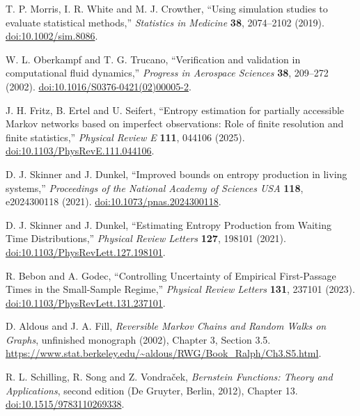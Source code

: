 T. P. Morris, I. R. White and M. J. Crowther,
``Using simulation studies to evaluate statistical methods,''
\emph{Statistics in Medicine} \textbf{38}, 2074--2102 (2019).
\href{https://doi.org/10.1002/sim.8086}{doi:10.1002/sim.8086}.

W. L. Oberkampf and T. G. Trucano,
``Verification and validation in computational fluid dynamics,''
\emph{Progress in Aerospace Sciences} \textbf{38}, 209--272 (2002).
\href{https://doi.org/10.1016/S0376-0421(02)00005-2}{doi:10.1016/S0376-0421(02)00005-2}.

J. H. Fritz, B. Ertel and U. Seifert,
``Entropy estimation for partially accessible Markov networks based on imperfect observations:
Role of finite resolution and finite statistics,''
\emph{Physical Review E} \textbf{111}, 044106 (2025).
\href{https://doi.org/10.1103/PhysRevE.111.044106}{doi:10.1103/PhysRevE.111.044106}.

D. J. Skinner and J. Dunkel,
``Improved bounds on entropy production in living systems,''
\emph{Proceedings of the National Academy of Sciences USA}
\textbf{118}, e2024300118 (2021).
\href{https://doi.org/10.1073/pnas.2024300118}{doi:10.1073/pnas.2024300118}.

D. J. Skinner and J. Dunkel,
``Estimating Entropy Production from Waiting Time Distributions,''
\emph{Physical Review Letters} \textbf{127}, 198101 (2021).
\href{https://doi.org/10.1103/PhysRevLett.127.198101}{doi:10.1103/PhysRevLett.127.198101}.

R. Bebon and A. Godec,
``Controlling Uncertainty of Empirical First-Passage Times in the Small-Sample Regime,''
\emph{Physical Review Letters} \textbf{131}, 237101 (2023).
\href{https://doi.org/10.1103/PhysRevLett.131.237101}{doi:10.1103/PhysRevLett.131.237101}.

D. Aldous and J. A. Fill,
\emph{Reversible Markov Chains and Random Walks on Graphs},
unfinished monograph (2002), Chapter 3, Section 3.5.
\url{https://www.stat.berkeley.edu/~aldous/RWG/Book_Ralph/Ch3.S5.html}.

R. L. Schilling, R. Song and Z. Vondra\v{c}ek,
\emph{Bernstein Functions: Theory and Applications}, second edition
(De Gruyter, Berlin, 2012), Chapter 13.
\href{https://doi.org/10.1515/9783110269338}{doi:10.1515/9783110269338}.

